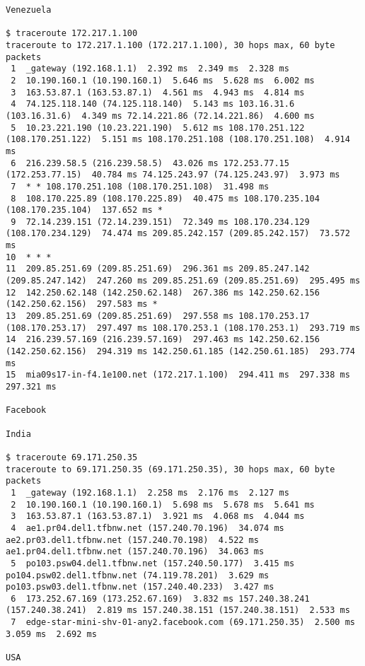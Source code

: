 \documentclass[a4paper]{article}
\begin{document}
\begin{lstlisting}
Venezuela

$ traceroute 172.217.1.100
traceroute to 172.217.1.100 (172.217.1.100), 30 hops max, 60 byte packets
 1  _gateway (192.168.1.1)  2.392 ms  2.349 ms  2.328 ms
 2  10.190.160.1 (10.190.160.1)  5.646 ms  5.628 ms  6.002 ms
 3  163.53.87.1 (163.53.87.1)  4.561 ms  4.943 ms  4.814 ms
 4  74.125.118.140 (74.125.118.140)  5.143 ms 103.16.31.6 (103.16.31.6)  4.349 ms 72.14.221.86 (72.14.221.86)  4.600 ms
 5  10.23.221.190 (10.23.221.190)  5.612 ms 108.170.251.122 (108.170.251.122)  5.151 ms 108.170.251.108 (108.170.251.108)  4.914 ms
 6  216.239.58.5 (216.239.58.5)  43.026 ms 172.253.77.15 (172.253.77.15)  40.784 ms 74.125.243.97 (74.125.243.97)  3.973 ms
 7  * * 108.170.251.108 (108.170.251.108)  31.498 ms
 8  108.170.225.89 (108.170.225.89)  40.475 ms 108.170.235.104 (108.170.235.104)  137.652 ms *
 9  72.14.239.151 (72.14.239.151)  72.349 ms 108.170.234.129 (108.170.234.129)  74.474 ms 209.85.242.157 (209.85.242.157)  73.572 ms
10  * * *
11  209.85.251.69 (209.85.251.69)  296.361 ms 209.85.247.142 (209.85.247.142)  247.260 ms 209.85.251.69 (209.85.251.69)  295.495 ms
12  142.250.62.148 (142.250.62.148)  267.386 ms 142.250.62.156 (142.250.62.156)  297.583 ms *
13  209.85.251.69 (209.85.251.69)  297.558 ms 108.170.253.17 (108.170.253.17)  297.497 ms 108.170.253.1 (108.170.253.1)  293.719 ms
14  216.239.57.169 (216.239.57.169)  297.463 ms 142.250.62.156 (142.250.62.156)  294.319 ms 142.250.61.185 (142.250.61.185)  293.774 ms
15  mia09s17-in-f4.1e100.net (172.217.1.100)  294.411 ms  297.338 ms  297.321 ms

Facebook

India

$ traceroute 69.171.250.35
traceroute to 69.171.250.35 (69.171.250.35), 30 hops max, 60 byte packets
 1  _gateway (192.168.1.1)  2.258 ms  2.176 ms  2.127 ms
 2  10.190.160.1 (10.190.160.1)  5.698 ms  5.678 ms  5.641 ms
 3  163.53.87.1 (163.53.87.1)  3.921 ms  4.068 ms  4.044 ms
 4  ae1.pr04.del1.tfbnw.net (157.240.70.196)  34.074 ms ae2.pr03.del1.tfbnw.net (157.240.70.198)  4.522 ms ae1.pr04.del1.tfbnw.net (157.240.70.196)  34.063 ms
 5  po103.psw04.del1.tfbnw.net (157.240.50.177)  3.415 ms po104.psw02.del1.tfbnw.net (74.119.78.201)  3.629 ms po103.psw03.del1.tfbnw.net (157.240.40.233)  3.427 ms
 6  173.252.67.169 (173.252.67.169)  3.832 ms 157.240.38.241 (157.240.38.241)  2.819 ms 157.240.38.151 (157.240.38.151)  2.533 ms
 7  edge-star-mini-shv-01-any2.facebook.com (69.171.250.35)  2.500 ms  3.059 ms  2.692 ms

USA


\end{lstlisting}
\end{document}
